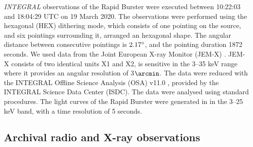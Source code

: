 \documentclass[fleqn,usenatbib]{mnras}
\begin{document}
\textit{INTEGRAL} observations of the Rapid Burster were executed between 10:22:03 and 18:04:29 UTC on 19 March 2020. The observations were performed using the hexagonal (HEX) dithering mode, which consists of one pointing on the source, and six pointings surrounding it, arranged an hexagonal shape. The angular distance between consecutive pointings is $2.17\degree$, and the pointing duration 1872 seconds. We used data from the Joint European X-ray Monitor (JEM-X) \citep{Lund03}. JEM-X consists of two identical units X1 and X2, is sensitive in the 3–35 keV range where it provides an angular resolution of 3$\arcmin$. The data were reduced  with the INTEGRAL Offline Science Analysis (OSA) v11.0 \citep{Courvoisier2003}, provided by the INTEGRAL Science Data Center (ISDC). The data were analysed using standard procedures. The light curves of the Rapid Burster were generated in in the 3–25 keV band, with a time resolution of 5 seconds.

\subsection{Archival radio and X-ray observations}
\end{document}
